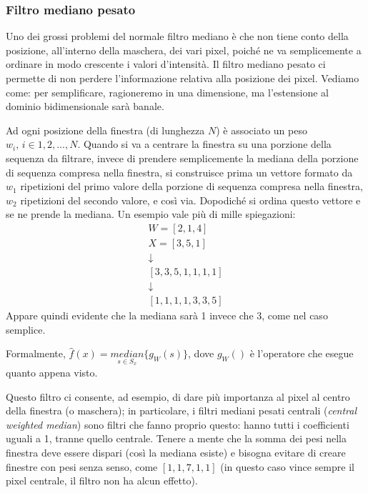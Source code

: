 \documentclass[a4paper,11pt]{article}
\begin{document}
\subsubsection{Filtro mediano pesato}
Uno dei grossi problemi del normale filtro mediano è che non tiene conto della posizione, all'interno della maschera, dei vari pixel, poiché ne va semplicemente a ordinare in modo crescente
i valori d'intensità. Il filtro mediano pesato ci permette di non perdere l'informazione relativa alla posizione dei pixel. Vediamo come: per semplificare, ragioneremo in una dimensione, ma l'estensione al dominio bidimensionale sarà banale.
\par
Ad ogni posizione della finestra (di lunghezza $N$) è associato un peso $w_{i}, \, i \in {1, 2, ..., N}$. Quando si va a centrare la finestra su una porzione della sequenza da filtrare, invece di prendere
semplicemente la mediana della porzione di sequenza compresa nella finestra, si construisce prima un vettore formato da $w_1$ ripetizioni del primo
valore della porzione di sequenza compresa nella finestra, $w_2$ ripetizioni del secondo valore, e così via.
Dopodiché si ordina questo vettore e se ne prende la mediana. Un esempio vale più di mille spiegazioni:
\begin{gather*}
    W = [2, 1 ,4] \\
    X = [3, 5, 1] \\
    \downarrow \\
    [3, 3, 5, 1, 1, 1, 1] \\
    \downarrow \\
    [1, 1, 1, 1, 3, 3, 5]
\end{gather*}
Appare quindi evidente che la mediana sarà 1 invece che 3, come nel caso semplice.
\par
Formalmente, $\hat{f}(x) = \underset{s \in S_x}{median}\{g_W(s)\}$, dove $g_W()$ è l'operatore che esegue quanto appena visto.
\par
Questo filtro ci consente, ad esempio, di dare più importanza al pixel al centro della finestra (o maschera); in particolare, i filtri mediani pesati centrali (\textit{central
weighted median}) sono filtri che fanno proprio questo: hanno tutti i coefficienti uguali a 1, tranne quello centrale. Tenere a mente che la somma dei pesi nella finestra
deve essere dispari (così la mediana esiste) e bisogna evitare di creare finestre con pesi senza senso, come $[1, 1, 7, 1, 1]$ (in questo caso vince sempre il pixel centrale, il
filtro non ha alcun effetto).
\end{document}
